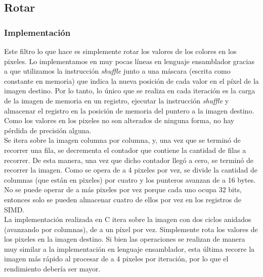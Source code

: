 \documentclass[a4paper]{article}
\begin{document}
\newpage
\subsection{Rotar}
\subsubsection{Implementación}
Este filtro lo que hace es simplemente rotar los valores de los colores en los pixeles. Lo implementamos en muy pocas líneas en lenguaje ensamblador gracias a que utilizamos la instrucción \textit{shuffle} junto a una máscara (escrita como constante en memoria) que indica la nueva posición de cada valor en el píxel de la imagen destino. Por lo tanto, lo único que se realiza en cada iteración es la carga de la imagen de memoria en un registro, ejecutar la instrucción \textit{shuffle} y almacenar el registro en la posición de memoria del puntero a la imagen destino. 
\\Como los valores en los pixeles no son alterados de ninguna forma, no hay pérdida de precisión alguna.\\

Se itera sobre la imagen columna por columna, y, una vez que se terminó de recorrer una fila, se decrementa el contador que contiene la cantidad de filas a recorrer. De esta manera, una vez que dicho contador llegó a cero, se terminó de recorrer la imagen. Como se opera de a 4 pixeles por vez, se divide la cantidad de columnas (que están en pixeles) por cuatro y los punteros avanzan de a 16 bytes. No se puede operar de a más pixeles por vez porque cada uno ocupa 32 bits, entonces solo se pueden almacenar cuatro de ellos por vez en los registros de SIMD.\\


La implementación realizada en C itera sobre la imagen con dos ciclos anidados (avanzando por columnas), de a un píxel por vez. Simplemente rota los valores de los pixeles en la imagen destino. Si bien las operaciones se realizan de manera muy similar a la implementación en lenguaje ensamblador, esta última recorre la imagen más rápido al procesar de a 4 pixeles por iteración, por lo que el rendimiento debería ser mayor.\\
\end{document}
